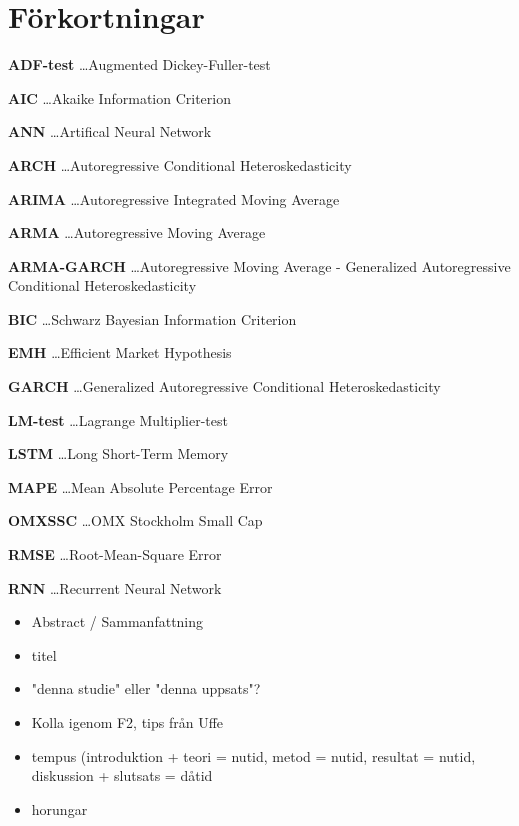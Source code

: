 \documentclass[11pt]{article}
\numberwithin{equation}{section}
\numberwithin{table}{section}
\numberwithin{figure}{section}
\begin{document}
\section*{Förkortningar}
\textbf{ADF-test} \dots Augmented Dickey-Fuller-test \par
\textbf{AIC} \dots Akaike Information Criterion \par
\textbf{ANN} \dots Artifical Neural Network \par
\textbf{ARCH} \dots Autoregressive Conditional Heteroskedasticity \par
\textbf{ARIMA} \dots Autoregressive Integrated Moving Average \par
\textbf{ARMA} \dots Autoregressive Moving Average \par 
\textbf{ARMA-GARCH} \dots Autoregressive Moving Average - Generalized Autoregressive Conditional Heteroskedasticity \par 
\textbf{BIC} \dots Schwarz Bayesian Information Criterion \par
\textbf{EMH} \dots Efficient Market Hypothesis \par
\textbf{GARCH} \dots Generalized Autoregressive Conditional Heteroskedasticity \par
\textbf{LM-test} \dots Lagrange Multiplier-test \par
\textbf{LSTM} \dots Long Short-Term Memory \par
\textbf{MAPE} \dots Mean Absolute Percentage Error \par
\textbf{OMXSSC} \dots OMX Stockholm Small Cap \par
\textbf{RMSE} \dots Root-Mean-Square Error \par
\textbf{RNN} \dots Recurrent Neural Network \par


\newpage
\thispagestyle{empty}

\begin{itemize}
    \item Abstract / Sammanfattning
    \item titel 
    \item "denna studie" eller "denna uppsats"?
    \item Kolla igenom F2, tips från Uffe
    
    \item tempus (introduktion + teori = nutid, metod = nutid, resultat = nutid,  diskussion + slutsats = dåtid
    \item horungar
\end{itemize}
\end{document}
